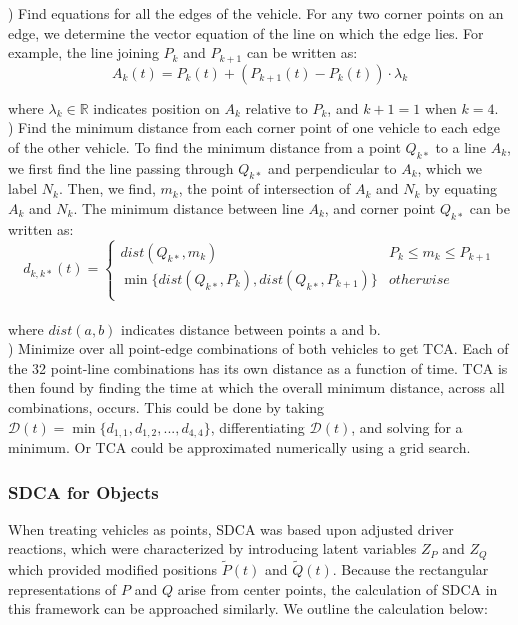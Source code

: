 \documentclass{article}
\begin{document}
) Find equations for all the edges of the vehicle. For any two corner points on an edge, we determine the vector equation of the line on which the edge lies. For example, the line joining $P_k$ and $P_{k+1}$ can be written as:
\begin{equation*}
A_k(t) = P_k(t) + (P_{k+1}(t)-P_k(t))\cdot\lambda_k
\end{equation*}

where $\lambda_k\in\mathbb{R}$ indicates position on $A_k$ relative to $P_k$, and $k + 1 = 1$ when $k = 4$. \\

) Find the minimum distance from each corner point of one vehicle to each edge of the other vehicle. To find the minimum distance from a point $Q_{k*}$ to a line $A_k$, we first find the line passing through $Q_{k*}$ and perpendicular to $A_k$, which we label $N_k$. Then, we find, $m_k$, the point of intersection of $A_k$ and $N_k$ by equating $A_k$ and $N_k$. The minimum distance between line $A_k$, and corner point $Q_{k*}$ can be written as:\\
\[d_{k,k*}(t) =   \left\{
\begin{array}{ll}
      dist(Q_{k*}, m_k) & P_k\leq m_k\leq P_{k+1}\\
      \min\{dist(Q_{k*}, P_k), dist(Q_{k*}, P_{k+1})\} & otherwise \\
\end{array} 
\right. \]\\
where $dist(a, b)$ indicates distance between points a and b.\\ 

) Minimize over all point-edge combinations of both vehicles to get TCA.  Each of the 32 point-line combinations has its own distance as a function of time. TCA is then found by finding the time at which the overall minimum distance, across all combinations, occurs. This could be done by taking $\mathcal{D}(t) = \min\{d_{1,1}, d_{1,2}, ..., d_{4,4}\}$, differentiating $\mathcal{D}(t)$, and solving for a minimum.  Or TCA could be approximated numerically using a grid search.

\subsubsection{SDCA for Objects}

When treating vehicles as points, SDCA was based upon adjusted driver reactions, which were characterized by introducing latent variables $Z_P$ and $Z_Q$ which provided modified positions $\tilde{P}(t)$ and $\tilde{Q}(t)$.  Because the rectangular representations of $P$ and $Q$ arise from center points, the calculation of SDCA in this framework can be approached similarly.  We outline the calculation below:
\end{document}

